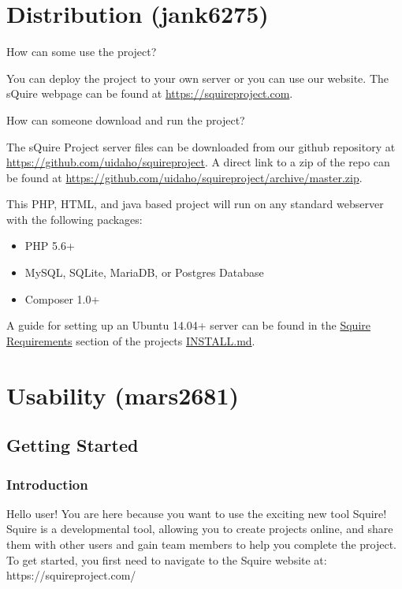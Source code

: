 \documentclass[11pt]{report}
\begin{document}
\chapter{Distribution (jank6275)}
    How can some use the project?
    
    You can deploy the project to your own server or you can use our website. The sQuire webpage can be found at \url{https://squireproject.com}.\par
    
    How can someone download and run the project?
    
    The sQuire Project server files can be downloaded from our github repository at \url{https://github.com/uidaho/squireproject}. 
    A direct link to a zip of the repo can be found at \url{https://github.com/uidaho/squireproject/archive/master.zip}.\par
    
    This PHP, HTML, and java based project will run on any standard webserver with the following packages:
    \begin{itemize}
        \item PHP 5.6+
        \item MySQL, SQLite, MariaDB, or Postgres Database
        \item Composer 1.0+
    \end{itemize}
    
    A guide for setting up an Ubuntu 14.04+ server can be found in the \href{https://github.com/uidaho/squireproject/blob/master/INSTALL.md#squire-requirements}{Squire Requirements} section of the projects \href{https://github.com/uidaho/squireproject/blob/master/INSTALL.md}{INSTALL.md}.


\chapter{Usability (mars2681)}
\section{Getting Started}
\subsection{Introduction}
    Hello user! You are here because you want to use the exciting new tool Squire! Squire is a developmental tool, allowing you to create projects online, and share them with other users and gain team members to help you complete the project. To get started, you first need to navigate to the Squire website at:  https://squireproject.com/
\end{document}
